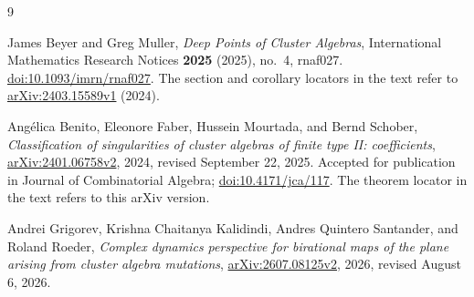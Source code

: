 \begin{thebibliography}{9}

James Beyer and Greg Muller,
\emph{Deep Points of Cluster Algebras},
International Mathematics Research Notices \textbf{2025} (2025), no.~4,
rnaf027.
\href{https://doi.org/10.1093/imrn/rnaf027}{doi:10.1093/imrn/rnaf027}.
The section and corollary locators in the text refer to
\href{https://arxiv.org/abs/2403.15589v1}{arXiv:2403.15589v1} (2024).

Ang\'elica Benito, Eleonore Faber, Hussein Mourtada, and Bernd Schober,
\emph{Classification of singularities of cluster algebras of finite type
II: coefficients},
\href{https://arxiv.org/abs/2401.06758v2}{arXiv:2401.06758v2},
2024, revised September 22, 2025.
Accepted for publication in Journal of Combinatorial Algebra;
\href{https://doi.org/10.4171/jca/117}{doi:10.4171/jca/117}.
The theorem locator in the text refers to this arXiv version.

Andrei Grigorev, Krishna Chaitanya Kalidindi, Andres Quintero Santander,
and Roland Roeder,
\emph{Complex dynamics perspective for birational maps of the plane
arising from cluster algebra mutations},
\href{https://arxiv.org/abs/2607.08125v2}{arXiv:2607.08125v2},
2026, revised August 6, 2026.

\end{thebibliography}
